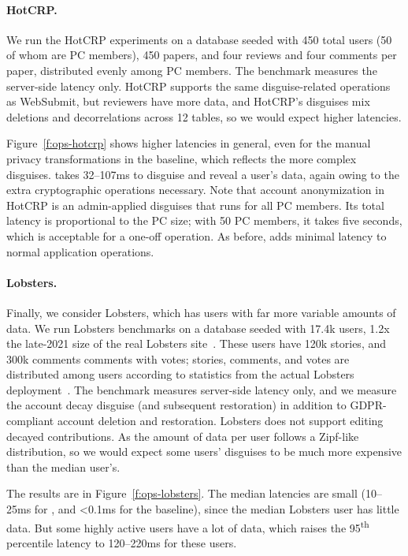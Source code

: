 \paragraph{HotCRP.}
%
We run the HotCRP experiments on a database seeded with 450 total users (50 of
whom are PC members), 450 papers, and four reviews and four comments per paper,
distributed evenly among PC members.
%
The benchmark measures the server-side latency only.
%
HotCRP supports the same disguise-related operations as WebSubmit, but reviewers
have more data, and HotCRP's disguises mix deletions and decorrelations across
12 tables, so we would expect higher latencies.
%

%
Figure~\ref{f:ops-hotcrp} shows higher latencies in general, even for the manual
privacy transformations in the baseline, which reflects the more complex
disguises.
%
\sys takes 32--107ms to disguise and reveal a user's data, again owing to the
extra cryptographic operations necessary.
%
Note that account anonymization in HotCRP is an admin-applied disguises that
runs for all PC members.
%
Its total latency is proportional to the PC size; \eg with 50 PC members, it takes
five seconds, which is acceptable for a one-off operation.
%
As before, \sys adds minimal latency to normal application operations.
%

\paragraph{Lobsters.}
%
Finally, we consider Lobsters, which has users with far more variable amounts of
data.
%
We run Lobsters benchmarks on a database seeded with 17.4k users, 1.2x the
late-2021 size of the real Lobsters site~\cite{lobsters}.
%
These users have 120k stories, and 300k comments comments with votes;
stories, comments, and votes are distributed among users according to
statistics from the actual Lobsters deployment~\cite{lobsters-data}.
%
The benchmark measures server-side latency only, and we measure the account
decay disguise (and subsequent restoration) in addition to GDPR-compliant
account deletion and restoration.
%
Lobsters does not support editing decayed contributions.
%
As the amount of data per user follows a Zipf-like distribution, so we would
expect some users' disguises to be much more expensive than the median user's.
%

%
The results are in Figure~\ref{f:ops-lobsters}.
%
The median latencies are small (10--25ms for \sys, and <0.1ms for the
baseline), since the median Lobsters user has little data.
%
But some highly active users have a lot of data, which raises the
95\textsuperscript{th} percentile latency to 120--220ms for these users.
%

